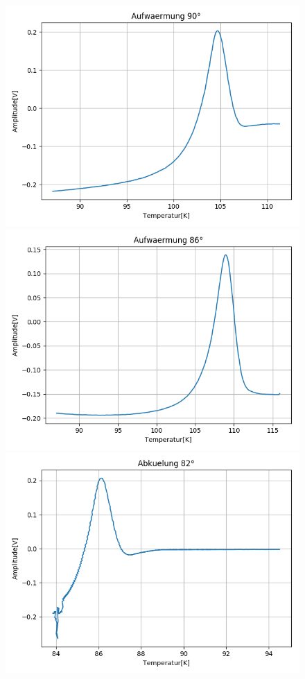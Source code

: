 \documentclass[12pt,a4paper]{article}
\begin{document}
\begin{figure}
\centering
\includegraphics[scale=0.5]{Bilder/Haupt_Supra/Kal_2.png}
\includegraphics[scale=0.5]{Bilder/Haupt_Supra/Kal_0.png}
\includegraphics[scale=0.5]{Bilder/Haupt_Supra/Kal_1.png}

\end{figure}
\end{document}
